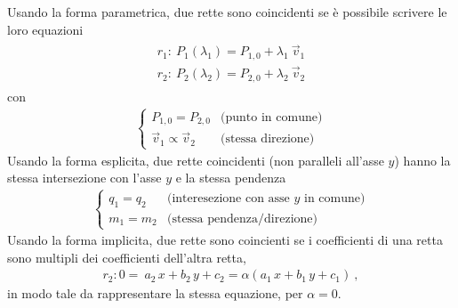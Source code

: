 \documentclass[letterpaper,10pt,english]{jupyterBook}
\begin{document}
\sphinxAtStartPar
Usando la forma parametrica, due rette sono coincidenti se è possibile scrivere le loro equazioni
\begin{equation*}
\begin{split}\begin{aligned}
  r_1: \ P_1(\lambda_1) = P_{1,0} + \lambda_1 \ \vec{v}_1 \\
  r_2: \ P_2(\lambda_2) = P_{2,0} + \lambda_2 \ \vec{v}_2
\end{aligned}\end{split}
\end{equation*}
\sphinxAtStartPar
con
\begin{equation*}
\begin{split}\begin{cases}
   P_{1,0} = P_{2,0} & \text{(punto in comune)} \\
   \vec{v}_1 \propto \vec{v}_2 & \text{(stessa direzione)}
\end{cases}\end{split}
\end{equation*}
\sphinxAtStartPar
Usando la forma esplicita, due rette coincidenti (non paralleli all’asse \(y\)) hanno la stessa intersezione con l’asse \(y\) e la stessa pendenza
\begin{equation*}
\begin{split}\begin{cases}
  q_1 = q_2 & \text{(interesezione con asse $y$ in comune)} \\
  m_1 = m_2 & \text{(stessa pendenza/direzione)}
\end{cases}\end{split}
\end{equation*}
\sphinxAtStartPar
Usando la forma implicita, due rette sono coincienti se i coefficienti di una retta sono multipli dei coefficienti dell’altra retta,
\begin{equation*}
\begin{split}r_2: 0 = \ a_2 \, x + b_2 \, y + c_2 = \alpha (a_1 \, x + b_1 \, y + c_1) \ , \end{split}
\end{equation*}
\sphinxAtStartPar
in modo tale da rappresentare la stessa equazione, per \(\alpha = 0\).
\end{document}
